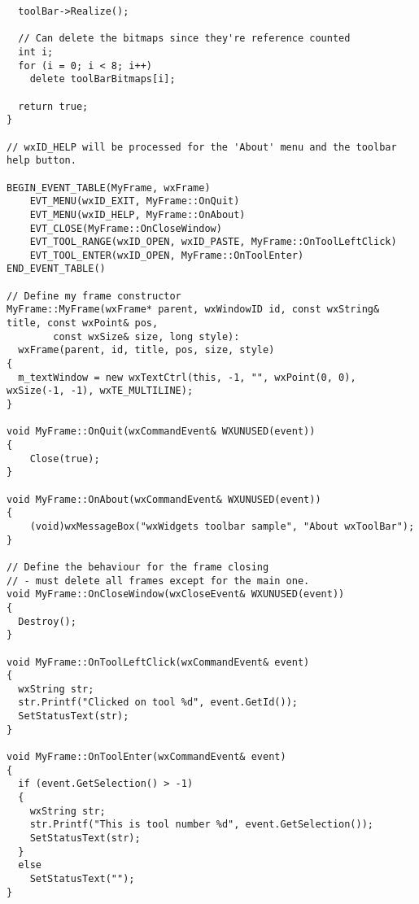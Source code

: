 {\begin{verbatim}
  toolBar->Realize();

  // Can delete the bitmaps since they're reference counted
  int i;
  for (i = 0; i < 8; i++)
    delete toolBarBitmaps[i];

  return true;
}

// wxID_HELP will be processed for the 'About' menu and the toolbar help button.

BEGIN_EVENT_TABLE(MyFrame, wxFrame)
    EVT_MENU(wxID_EXIT, MyFrame::OnQuit)
    EVT_MENU(wxID_HELP, MyFrame::OnAbout)
    EVT_CLOSE(MyFrame::OnCloseWindow)
    EVT_TOOL_RANGE(wxID_OPEN, wxID_PASTE, MyFrame::OnToolLeftClick)
    EVT_TOOL_ENTER(wxID_OPEN, MyFrame::OnToolEnter)
END_EVENT_TABLE()

// Define my frame constructor
MyFrame::MyFrame(wxFrame* parent, wxWindowID id, const wxString& title, const wxPoint& pos,
        const wxSize& size, long style):
  wxFrame(parent, id, title, pos, size, style)
{
  m_textWindow = new wxTextCtrl(this, -1, "", wxPoint(0, 0), wxSize(-1, -1), wxTE_MULTILINE);
}

void MyFrame::OnQuit(wxCommandEvent& WXUNUSED(event))
{
    Close(true);
}

void MyFrame::OnAbout(wxCommandEvent& WXUNUSED(event))
{
    (void)wxMessageBox("wxWidgets toolbar sample", "About wxToolBar");
}

// Define the behaviour for the frame closing
// - must delete all frames except for the main one.
void MyFrame::OnCloseWindow(wxCloseEvent& WXUNUSED(event))
{
  Destroy();
}

void MyFrame::OnToolLeftClick(wxCommandEvent& event)
{
  wxString str;
  str.Printf("Clicked on tool %d", event.GetId());
  SetStatusText(str);
}

void MyFrame::OnToolEnter(wxCommandEvent& event)
{
  if (event.GetSelection() > -1)
  {
    wxString str;
    str.Printf("This is tool number %d", event.GetSelection());
    SetStatusText(str);
  }
  else
    SetStatusText("");
}
\end{verbatim}
}

